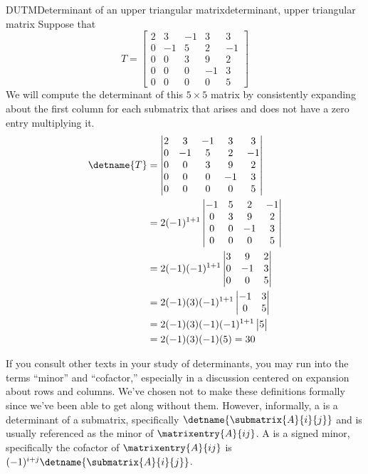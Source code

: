 \begin{example}{DUTM}{Determinant of an upper triangular matrix}{determinant, upper triangular matrix}
Suppose that 
%
\begin{equation*}
T=
\begin{bmatrix}
2 & 3 & -1 & 3 & 3\\
0 & -1 & 5 & 2 & -1\\
0 & 0 & 3 & 9 & 2\\
0 & 0 & 0 & -1 & 3\\
0 & 0 & 0 & 0 & 5
\end{bmatrix}
\end{equation*}
%
We will compute the determinant of this $5\times 5$ matrix by consistently expanding about the first column for each submatrix that arises and does not have a zero entry multiplying it.
%
\begin{align*}
\detname{T}&=
\begin{vmatrix}
2 & 3 & -1 & 3 & 3\\
0 & -1 & 5 & 2 & -1\\
0 & 0 & 3 & 9 & 2\\
0 & 0 & 0 & -1 & 3\\
0 & 0 & 0 & 0 & 5
\end{vmatrix}\\
%
&=2(-1)^{1+1}
\begin{vmatrix}
-1 & 5 & 2 & -1\\
 0 & 3 & 9 & 2\\
 0 & 0 & -1 & 3\\
 0 & 0 & 0 & 5
\end{vmatrix}\\
%
&=2(-1)(-1)^{1+1}
\begin{vmatrix}
 3 & 9 & 2\\
 0 & -1 & 3\\
 0 & 0 & 5
\end{vmatrix}\\
%
&=2(-1)(3)(-1)^{1+1}
\begin{vmatrix}
 -1 & 3\\
 0 & 5
\end{vmatrix}\\
%
&=2(-1)(3)(-1)(-1)^{1+1}
\begin{vmatrix}
5
\end{vmatrix}\\
%
&=2(-1)(3)(-1)(5)=30
\end{align*}
%
\end{example}
%
If you consult other texts in your study of determinants, you may run into the terms ``minor'' and ``cofactor,'' especially in a discussion centered on expansion about rows and columns.  We've chosen not to make these definitions formally since we've been able to get along without them.  However, informally, a  is a determinant of a submatrix, specifically $\detname{\submatrix{A}{i}{j}}$ and is usually referenced as the minor of $\matrixentry{A}{ij}$.  A  is a signed minor, specifically the cofactor of $\matrixentry{A}{ij}$ is $(-1)^{i+j}\detname{\submatrix{A}{i}{j}}$.
%
%
